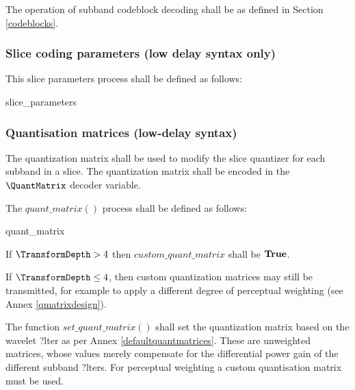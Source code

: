 The operation of subband codeblock decoding shall be as defined in Section \ref{codeblocks}.

\subsubsection{Slice coding parameters (low delay syntax only)}
\label{sliceparams}

This slice parameters process shall be defined as follows:

\begin{pseudo}{slice\_parameters}{}
\end{pseudo}

\subsubsection{Quantisation matrices (low-delay syntax)}
\label{quantmatrix}

The quantization matrix shall be used to modify the slice quantizer for each subband in
 a slice. The quantization matrix shall be encoded in the $\QuantMatrix$ decoder variable. 

The $quant\_matrix()$ process shall be defined as follows:

\begin{pseudo}{quant\_matrix}{}
    \bsEND
\bsELSE
\bsEND
\end{pseudo}

If $\TransformDepth> 4$ then $custom\_quant\_matrix$  shall be $\text{\bf{True}}$. 

If $\TransformDepth \leq 4$, then custom quantization 
matrices may still be transmitted, 
for example to apply a different degree of perceptual weighting 
(see Annex \ref{qmatrixdesign}). 

The function $set\_quant\_matrix()$ shall set the quantization matrix 
based on the wavelet ?lter as per Annex \ref{defaultquantmatrices}. These are 
unweighted matrices, whose values merely compensate for the differential power 
gain of the different subband ?lters. For perceptual weighting a custom 
quantisation matrix must be used.

